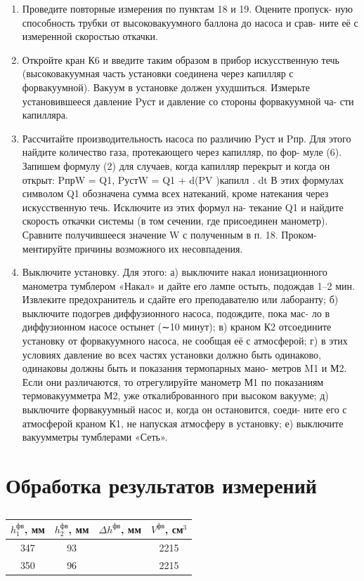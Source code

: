 \documentclass[a4paper,12pt]{article} %
\begin{document}
\begin{enumerate}
\item Проведите повторные измерения по пунктам 18 и 19. Оцените пропуск- ную способность трубки от высоковакуумного баллона до насоса и срав- ните её с измеренной скоростью откачки.
\item Откройте кран К6 и введите таким образом в прибор искусственную течь (высоковакуумная часть установки соединена через капилляр с форвакуумной). Вакуум в установке должен ухудшиться. Измерьте установившееся давление Pуст и давление со стороны форвакуумной ча- сти капилляра.
\item Рассчитайте производительность насоса по различию Pуст и Pпр. Для этого найдите количество газа, протекающего через капилляр, по фор- муле (6). Запишем формулу (2) для случаев, когда капилляр перекрыт и когда он открыт:
PпрW = Q1, PустW = Q1 + d(PV )капилл . dt
В этих формулах символом Q1 обозначена сумма всех натеканий, кроме натекания через искусственную течь. Исключите из этих формул на- текание Q1 и найдите скорость откачки системы (в том сечении, где присоединен манометр).
Сравните получившееся значение W с полученным в п. 18. Проком- ментируйте причины возможного их несовпадения.
\item Выключите установку. Для этого:
а) выключите накал ионизационного манометра тумблером «Накал»
и дайте его лампе остыть, подождав 1–2 мин. Извлеките предохранитель и сдайте его преподавателю или лаборанту;
б) выключите подогрев диффузионного насоса, подождите, пока мас- ло в диффузионном насосе остынет (∼10 минут);
в) краном К2 отсоедините установку от форвакуумного насоса, не сообщая её с атмосферой;
г) в этих условиях давление во всех частях установки должно быть одинаково, одинаковы должны быть и показания термопарных мано- метров M1 и М2. Если они различаются, то отрегулируйте манометр М1 по показаниям термовакуумметра М2, уже откалиброванного при высоком вакууме;
д) выключите форвакуумный насос и, когда он остановится, соеди- ните его с атмосферой краном К1, не напуская атмосферу в установку;
е) выключите вакуумметры тумблерами «Сеть».

\end{enumerate}

\section*{Обработка результатов измерений}

\begin{table}[h]
  \caption{}
  \begin{tabular}{|c|c|c|c|}
      \hline $h_1^{\text{фв}}$, мм  &  $h_2^{\text{фв}}$, мм & $\Delta h^{\text{фв}}$, мм  &  $V^{\text{фв}}$, см$^3$ \\
      \hline
      347 & 93  &   & 2215 \\
      350 & 96  &   & 2215 \\
      \hline 
  \end{tabular}
  \label{tab:}
\end{table}
\end{document}
